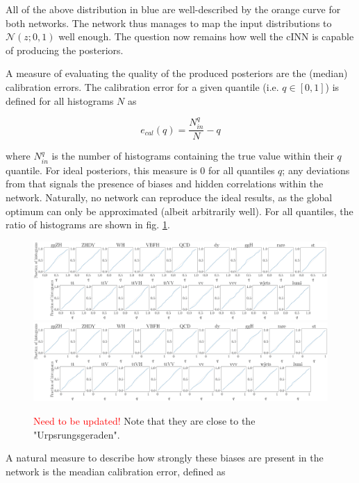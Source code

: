 All of the above distribution in blue are well-described by the orange curve for both networks. The network thus manages to map the input distributions to $\mathcal{N}(z; 0,1)$ well enough. The question now remains how well the cINN is capable of producing the posteriors.

\Subsection{\textcolor{red}{Calibration Curves}}

A measure of evaluating the quality of the produced posteriors are the (median) calibration errors. The calibration error for a given quantile (i.e. $q\in [0, 1]$) is defined for all histograms $N$ as

\begin{equation*}
	e_{cal}(q) = \frac{N^q_{in}}{N} - q
\end{equation*}

where $N^q_{in}$ is the number of histograms containing the true value within their $q$ quantile. For ideal posteriors, this measure is 0 for all quantiles $q$; any deviations from that signals the presence of biases and hidden correlations within the network. Naturally, no network can reproduce the ideal results, as the global optimum can only be approximated (albeit arbitrarily well). For all quantiles, the ratio of histograms are shown in fig. \ref{fig:ecals}.

\begin{figure}[h!]
	\centering
	\includegraphics[width=\linewidth]{figures/inference/ecal}
	\includegraphics[width=\linewidth]{figures/inference/ecal_SN}
	\caption{\textcolor{red}{Need to be updated!} Note that they are close to the "Urpsrungsgeraden".}
	\label{fig:ecals}
\end{figure}

A natural measure to describe how strongly these biases are present in the network is the meadian calibration error, defined as

